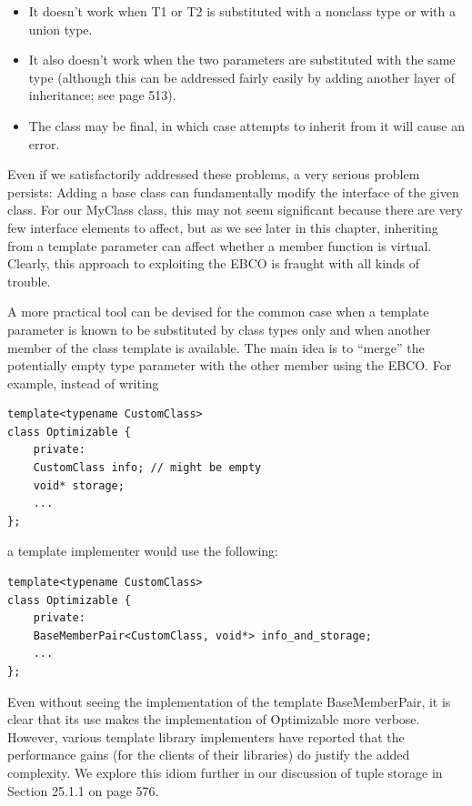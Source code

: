 \begin{itemize}
\item 
It doesn’t work when T1 or T2 is substituted with a nonclass type or with a union type.

\item 
It also doesn’t work when the two parameters are substituted with the same type (although this can be addressed fairly easily by adding another layer of inheritance; see page 513).

\item 
The class may be final, in which case attempts to inherit from it will cause an error.
\end{itemize}

Even if we satisfactorily addressed these problems, a very serious problem persists: Adding a base class can fundamentally modify the interface of the given class. For our MyClass class, this may not seem significant because there are very few interface elements to affect, but as we see later in this chapter, inheriting from a template parameter can affect whether a member function is virtual. Clearly, this approach to exploiting the EBCO is fraught with all kinds of trouble.

A more practical tool can be devised for the common case when a template parameter is known to be substituted by class types only and when another member of the class template is available. The main idea is to “merge” the potentially empty type parameter with the other member using the EBCO. For example, instead of writing

\begin{lstlisting}[style=styleCXX]
template<typename CustomClass>
class Optimizable {
	private:
	CustomClass info; // might be empty
	void* storage;
	...
};
\end{lstlisting}

a template implementer would use the following:

\begin{lstlisting}[style=styleCXX]
template<typename CustomClass>
class Optimizable {
	private:
	BaseMemberPair<CustomClass, void*> info_and_storage;
	...
};
\end{lstlisting}

Even without seeing the implementation of the template BaseMemberPair, it is clear that its use makes the implementation of Optimizable more verbose. However, various template library implementers have reported that the performance gains (for the clients of their libraries) do justify the added complexity. We explore this idiom further in our discussion of tuple storage in Section 25.1.1 on page 576.

